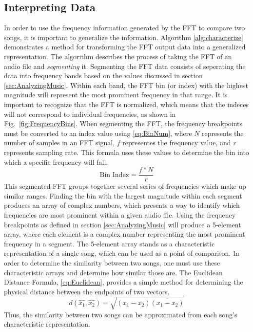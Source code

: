 \documentclass[conference]{IEEEtran}
\begin{document}
\subsection{Interpreting Data}\label{sec:interpreting}
In order to use the frequency information generated by the FFT to compare two songs, it is important to generalize the information. Algorithm \eqref{alg:characterize} demonstrates a method for transforming the FFT output data into a generalized representation. The algorithm describes the process of taking the FFT of an audio file and \textit{segmenting} it. Segmenting the FFT data consists of seperating the data into frequency bands based on the values discussed in section \eqref{sec:AnalyzingMusic}. Within each band, the FFT bin (or index) with the highest magnitude will represent the most prominent frequency in that range. It is important to recognize that the FFT is normalized, which means that the indeces will not correspond to individual frequencies, as shown in Fig.~\eqref{fig:FrequencyBins}. When segmenting the FFT, the frequency breakpoints must be converted to an index value using \eqref{eq:BinNum}, where $N$ represents the number of samples in an FFT signal, $f$ representes the frequency value, and $r$ represents sampling rate. This formula uses these values to determine the bin into which a specific frequency will fall.
\begin{equation}\label{eq:BinNum}
  \text{Bin Index}=\frac{f * N}{r}
\end{equation}
This segmented FFT groups together several series of frequencies which make up similar ranges. Finding the bin with the largest magnitude within each segment produces an array of complex numbers, which presents a way to identify which frequencies are most prominent within a given audio file. Using the frequency breakpoints as defined in section \eqref{sec:AnalyzingMusic} will produce a 5-element array, where each element is a complex number representing the most prominent frequency in a segment. The 5-element array stands as a characteristic representation of a single song, which can be used as a point of comparison. In order to determine the similarity between two songs, one must use these characteristic arrays and determine how similar those are. The Euclidean Distance Formula, \eqref{eq:Euclidean}, provides a simple method for determining the physical distance between the endpoints of two vectors.
\begin{equation}\label{eq:Euclidean}
  d(\hat{x_1},\hat{x_2})=\sqrt{(x_1-x_2)\overline{(x_1-x_2)}}
\end{equation}
Thus, the similarity between two songs can be approximated from each song's characteristic representation.
\end{document}
